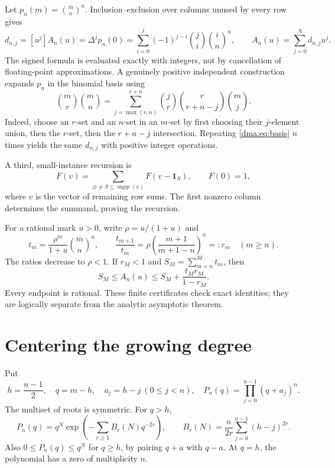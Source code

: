 \documentclass[11pt,letterpaper]{article}
\theoremstyle{remark}\newtheorem{remark}[theorem]{Remark}
\begin{document}
Let $p_n(m)=\binom mn^n$. Inclusion--exclusion over columns unused by every row gives
\begin{equation}\label{dma:eq:difference}
 d_{n,j}=[u^j]A_n(u)=\Delta^jp_n(0)
 =\sum_{i=0}^j(-1)^{j-i}\binom ji\binom in^n,
 \qquad A_n(u)=\sum_{j=0}^{N}d_{n,j}u^j.
\end{equation}
The signed formula is evaluated exactly with integers, not by cancellation of floating-point approximations. A genuinely positive independent construction expands $p_n$ in the binomial basis using
\begin{equation}\label{dma:eq:basis}
 \binom mr\binom mn
 =\sum_{j=\max(r,n)}^{r+n}\binom jr\binom r{r+n-j}\binom mj.
\end{equation}
Indeed, choose an $r$-set and an $n$-set in an $m$-set by first choosing their $j$-element union, then the $r$-set, then the $r+n-j$ intersection. Repeating \eqref{dma:eq:basis} $n$ times yields the same $d_{n,j}$ with positive integer operations.

A third, small-instance recursion is
\begin{equation}\label{dma:eq:grid}
 F(v)=\sum_{\varnothing\ne S\subseteq\operatorname{supp}(v)}F(v-\boldsymbol1_S),
 \qquad F(0)=1,
\end{equation}
where $v$ is the vector of remaining row sums. The first nonzero column determines the summand, proving the recursion.

For a rational mark $u>0$, write $\rho=u/(1+u)$ and
\[
 t_m=\frac{\rho^m}{1+u}\binom mn^n,\qquad
 \frac{t_{m+1}}{t_m}=\rho\left(\frac{m+1}{m+1-n}\right)^n=:r_m
 \quad(m\geq n).
\]
The ratios decrease to $\rho<1$. If $r_M<1$ and $S_M=\sum_{m=n}^M t_m$, then
\begin{equation}\label{dma:eq:tail}
 S_M\leq A_n(u)\leq S_M+\frac{t_Mr_M}{1-r_M}.
\end{equation}
Every endpoint is rational. These finite certificates check exact identities; they are logically separate from the analytic asymptotic theorem.

\section{Centering the growing degree}\label{dma:sec:center}
Put
\[
 h=\frac{n-1}2,\quad q=m-h,\quad a_j=h-j\ (0\leq j<n),\quad
 P_n(q)=\prod_{j=0}^{n-1}(q+a_j)^n.
\]
The multiset of roots is symmetric. For $q>h$,
\begin{equation}\label{dma:eq:rootexp}
 P_n(q)=q^N\exp\left(-\sum_{r\geq1}B_r(N)q^{-2r}\right),\qquad
 B_r(N)=\frac n{2r}\sum_{j=0}^{n-1}(h-j)^{2r}.
\end{equation}
Also $0\leq P_n(q)\leq q^N$ for $q\geq h$, by pairing $q+a$ with $q-a$. At $q=h$, the polynomial has a zero of multiplicity $n$.
\end{document}
